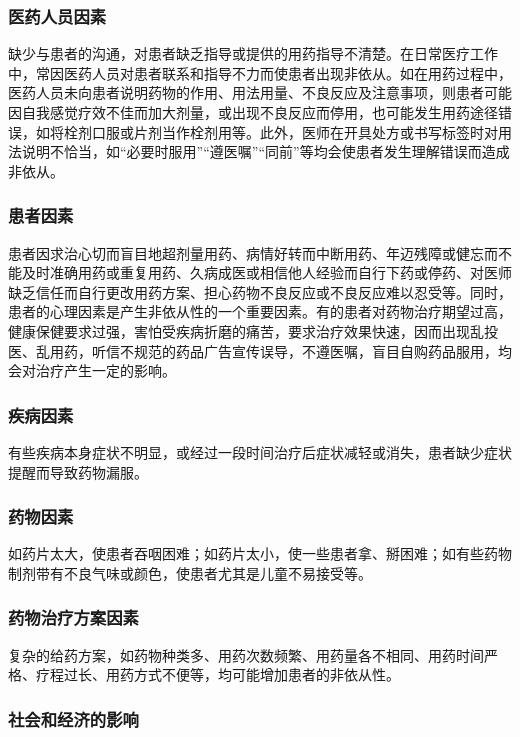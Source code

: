 \subsubsection{医药人员因素}

缺少与患者的沟通，对患者缺乏指导或提供的用药指导不清楚。在日常医疗工作中，常因医药人员对患者联系和指导不力而使患者出现非依从。如在用药过程中，医药人员未向患者说明药物的作用、用法用量、不良反应及注意事项，则患者可能因自我感觉疗效不佳而加大剂量，或出现不良反应而停用，也可能发生用药途径错误，如将栓剂口服或片剂当作栓剂用等。此外，医师在开具处方或书写标签时对用法说明不恰当，如“必要时服用”“遵医嘱”“同前”等均会使患者发生理解错误而造成非依从。

\subsubsection{患者因素}

患者因求治心切而盲目地超剂量用药、病情好转而中断用药、年迈残障或健忘而不能及时准确用药或重复用药、久病成医或相信他人经验而自行下药或停药、对医师缺乏信任而自行更改用药方案、担心药物不良反应或不良反应难以忍受等。同时，患者的心理因素是产生非依从性的一个重要因素。有的患者对药物治疗期望过高，健康保健要求过强，害怕受疾病折磨的痛苦，要求治疗效果快速，因而出现乱投医、乱用药，听信不规范的药品广告宣传误导，不遵医嘱，盲目自购药品服用，均会对治疗产生一定的影响。

\subsubsection{疾病因素}

有些疾病本身症状不明显，或经过一段时间治疗后症状减轻或消失，患者缺少症状提醒而导致药物漏服。

\subsubsection{药物因素}

如药片太大，使患者吞咽困难；如药片太小，使一些患者拿、掰困难；如有些药物制剂带有不良气味或颜色，使患者尤其是儿童不易接受等。

\subsubsection{药物治疗方案因素}

复杂的给药方案，如药物种类多、用药次数频繁、用药量各不相同、用药时间严格、疗程过长、用药方式不便等，均可能增加患者的非依从性。

\subsubsection{社会和经济的影响}

